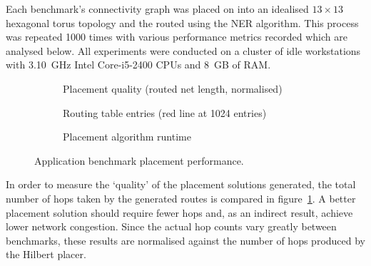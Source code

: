 				Each benchmark's connectivity graph was placed on into an idealised $13
				\times 13$ hexagonal torus topology and the routed using the NER
				algorithm. This process was repeated \num{1000} times with various
				performance metrics recorded which are analysed below. All experiments
				were conducted on a cluster of idle workstations with 3.10~GHz Intel
				Core-i5-2400 CPUs and 8~GB of RAM.
			
				\begin{figure}
					\center
					\begin{subfigure}{\linewidth}
						\center
						
						\caption{Placement quality (routed net length, normalised)}
						\label{fig:application-benchmarks-quality}
					\end{subfigure}
					
					\vspace*{1em}
					
					\begin{subfigure}{\linewidth}
						\center
						
						\caption{Routing table entries (red line at \num{1024} entries)}
						\label{fig:application-benchmarks-tables}
					\end{subfigure}
					
					\vspace*{1em}
					
					\begin{subfigure}{\linewidth}
						\center
						
						\caption{Placement algorithm runtime}
						\label{fig:application-benchmarks-runtime}
					\end{subfigure}
					
					\caption{Application benchmark placement performance.}
					\label{fig:application-benchmarks}
				\end{figure}
				
				In order to measure the `quality' of the placement solutions generated,
				the total number of hops taken by the generated routes is compared in
				figure~\ref{fig:application-benchmarks-quality}. A better placement
				solution should require fewer hops and, as an indirect result, achieve
				lower network congestion.  Since the actual hop counts vary greatly
				between benchmarks, these results are normalised against the number of
				hops produced by the Hilbert placer.
				
